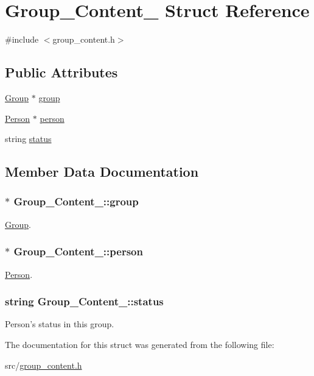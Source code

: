 \hypertarget{structGroup__Content__}{
\section{Group\_\-Content\_\- Struct Reference}
\label{d9/d96/structGroup__Content__}
}


{\ttfamily \#include $<$group\_\-content.h$>$}

\subsection*{Public Attributes}
\begin{DoxyCompactItemize}
\item 
\hyperlink{classGroup}{Group} $\ast$ \hyperlink{structGroup__Content___a5d4584e061a790c1543ed43be2e68af5}{group}
\item 
\hyperlink{classPerson}{Person} $\ast$ \hyperlink{structGroup__Content___aaee52f465ae5b393ad625663a228a040}{person}
\item 
string \hyperlink{structGroup__Content___acd55c0cc8ecafe72189cc849c07da3b3}{status}
\end{DoxyCompactItemize}


\subsection{Member Data Documentation}
\hypertarget{structGroup__Content___a5d4584e061a790c1543ed43be2e68af5}{
\subsubsection[{group}]{$\ast$ {\bf Group\_\-Content\_\-::group}}}
\label{d9/d96/structGroup__Content___a5d4584e061a790c1543ed43be2e68af5}
\hyperlink{classGroup}{Group}. \hypertarget{structGroup__Content___aaee52f465ae5b393ad625663a228a040}{
\subsubsection[{person}]{$\ast$ {\bf Group\_\-Content\_\-::person}}}
\label{d9/d96/structGroup__Content___aaee52f465ae5b393ad625663a228a040}
\hyperlink{classPerson}{Person}. \hypertarget{structGroup__Content___acd55c0cc8ecafe72189cc849c07da3b3}{
\subsubsection[{status}]{\setlength{\rightskip}{0pt plus 5cm}string {\bf Group\_\-Content\_\-::status}}}
\label{d9/d96/structGroup__Content___acd55c0cc8ecafe72189cc849c07da3b3}
Person's status in this group. 

The documentation for this struct was generated from the following file:\begin{DoxyCompactItemize}
\item 
src/\hyperlink{group__content_8h}{group\_\-content.h}\end{DoxyCompactItemize}
